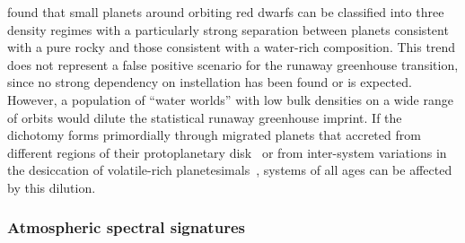 \documentclass[twocolumn,twocolappendix]{aastex631}
\begin{document}
\citet{Luque2022} found that small planets around orbiting red dwarfs can be classified into three density regimes with a particularly strong separation between planets consistent with a pure rocky and those consistent with a water-rich composition.
This trend does not represent a false positive scenario for the runaway greenhouse transition, since no strong dependency on instellation has been found or is expected.
However, a population of ``water worlds'' with low bulk densities on a wide range of orbits would dilute the statistical runaway greenhouse imprint.
If the dichotomy forms primordially through migrated planets that accreted from different regions of their protoplanetary disk~\citep{Venturini2020,Burn2021,Schlecker2021,Schlecker2021b} or from inter-system variations in the desiccation of volatile-rich planetesimals~\citep{Lichtenberg2019,2021Sci...371..365L,2021ApJ...913L..20L,2022ApJ...938L...3L,2023NatAs...7...39B}, systems of all ages can be affected by this dilution.

\subsubsection{Atmospheric spectral signatures}\label{sec:dis_atmospheres}
\end{document}
